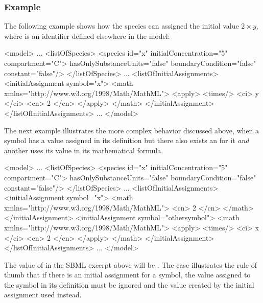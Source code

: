 \subsubsection{Example}

The following example shows how the species  can assigned
the initial value $2 \times y$, where  is an identifier
defined elsewhere in the model:

\begin{example}

<model>
    ...
    <listOfSpecies>
        <species id="x" initialConcentration="5" compartment="C">
                 hasOnlySubstanceUnits="false" boundaryCondition="false" 
                 constant="false"/>
    </listOfSpecies>
    ...
    <listOfInitialAssignments>
        <initialAssignment symbol="x">
            <math xmlns="http://www.w3.org/1998/Math/MathML">
                <apply>
                    <times/> 
                    <ci> y </ci> 
                    <cn> 2 </cn>
                </apply>
            </math>
        </initialAssignment>
    </listOfInitialAssignments>
    ...
</model>
\end{example}

The next example illustrates the more complex behavior discussed
above, when a symbol has a value assigned in its definition but
there also exists an \InitialAssignment for it \emph{and} another
\InitialAssignment uses its value in its mathematical formula.

\begin{example}
<model>
    ...
    <listOfSpecies>
        <species id="x" initialConcentration="5" compartment="C">
                 hasOnlySubstanceUnits="false" boundaryCondition="false" 
                 constant="false"/>
    </listOfSpecies>
    ...
    <listOfInitialAssignments>
        <initialAssignment symbol="x">
            <math xmlns="http://www.w3.org/1998/Math/MathML">
                <cn> 2 </cn>
            </math>
        </initialAssignment>
        <initialAssignment symbol="othersymbol">
            <math xmlns="http://www.w3.org/1998/Math/MathML">
                <apply>
                    <times/>
                    <ci> x </ci>
                    <cn> 2 </cn>
                </apply>
            </math>
        </initialAssignment>
    </listOfInitialAssignments>
    ...
</model>
\end{example}

The value of  in the SBML excerpt above will be
.  The case illustrates the rule of thumb that if there is
an initial assignment for a symbol, the value assigned to the
symbol in its definition must be ignored and the value created by
the initial assignment used instead.


